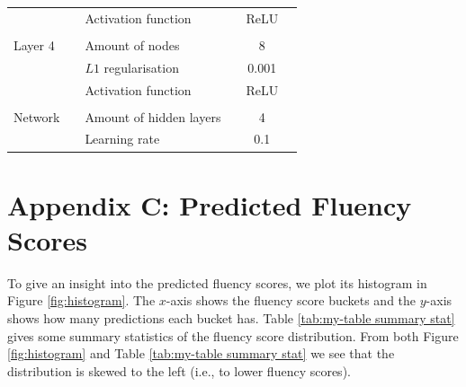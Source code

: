 \documentclass[11pt]{article}
\begin{document}
\begin{table}[h]
\begin{center}
\begin{tabular}{llllcl}
                              &                      & Activation function                &                      & ReLU                 &                      \\
                              &                      &                                    &                      &                      &                      \\
Layer 4                       &                      & Amount of nodes                    &                      & 8                    &                      \\
                              &                      & $L1$ regularisation                &                      & 0.001                &                      \\
                              &                      & Activation function                &                      & ReLU                 &                      \\
                              &                      &                                    &                      &                      &                      \\ \midrule
Network                       &                      & Amount of  hidden layers           &                      & 4                    &                      \\
                              &                      & Learning rate                      &                      & 0.1                  &                      \\ \bottomrule
\end{tabular}
\end{center}
\end{table}
\vspace{1cm}














\newpage
\section*{Appendix C: Predicted Fluency Scores}\label{Appendix C}
To give an insight into the predicted fluency scores, we plot its histogram in Figure \ref{fig:histogram}. The $x$-axis shows the fluency score buckets and the $y$-axis shows how many predictions each bucket has. Table \ref{tab:my-table summary stat} gives some summary statistics of the fluency score distribution. From both Figure \ref{fig:histogram} and Table \ref{tab:my-table summary stat} we see that the distribution is skewed to the left (i.e., to lower fluency scores).
\end{document}
